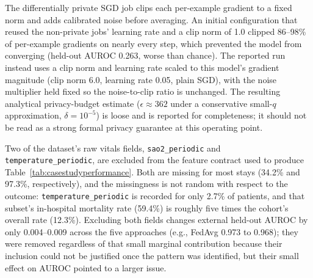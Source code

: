 

The differentially private SGD job clips each per-example gradient to a fixed norm and
adds calibrated noise before averaging. An initial configuration that reused the
non-private jobs' learning rate and a clip norm of 1.0 clipped 86--98\% of per-example
gradients on nearly every step, which prevented the model from converging (held-out
AUROC 0.263, worse than chance). The reported run instead uses a clip norm and learning
rate scaled to this model's gradient magnitude (clip norm 6.0, learning rate 0.05,
plain SGD), with the noise multiplier held fixed so the noise-to-clip ratio is
unchanged. The resulting analytical privacy-budget estimate ($\epsilon \approx 362$
under a conservative small-$q$ approximation, $\delta = 10^{-5}$) is loose and is
reported for completeness; it should not be read as a strong formal privacy guarantee
at this operating point.

Two of the dataset's raw vitals fields, \texttt{sao2\_periodic} and
\texttt{temperature\_periodic}, are excluded from the feature contract used to
produce Table~\ref{tab:casestudyperformance}. Both are missing for most stays
(34.2\% and 97.3\%, respectively), and the missingness is not random with respect to
the outcome: \texttt{temperature\_periodic} is recorded for only 2.7\% of patients,
and that subset's in-hospital mortality rate (59.4\%) is roughly five times the
cohort's overall rate (12.3\%). Excluding both fields changes external held-out
AUROC by only 0.004--0.009 across the five approaches (e.g., FedAvg 0.973 to
0.968); they were removed regardless of that small marginal contribution because
their inclusion could not be justified once the pattern was identified, but their
small effect on AUROC pointed to a larger issue.

